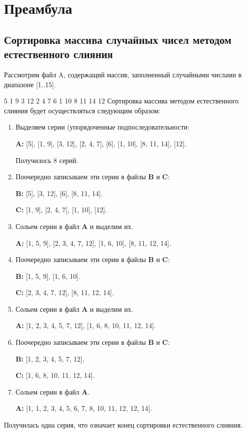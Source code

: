 \documentclass[a4paper, 14pt]{extarticle}
\begin{document}

\newpage
\tableofcontents
\newpage
\section{Преамбула}
\subsection{Сортировка массива случайных чисел методом естественного слияния}
Рассмотрим файл A, содержащий массив, заполненный случайными числами в диапазоне [1..15].

5 1 9 3 12 2 4 7 6 1 10 8 11 14 12
Сортировка массива методом естественного слияния будет осуществляться
следующим образом:
\begin{enumerate}
  \item Выделяем серии (упорядоченные подпоследовательности:

    \textbf{A:} [5], [1, 9], [3, 12], [2, 4, 7], [6], [1, 10], [8, 11, 14], [12].

    Получилось 8 серий.
  \item Поочередно записываем эти серии в файлы \textbf{B} и \textbf{C}:

    \textbf{B:} [5], [3, 12], [6], [8, 11, 14].

    \textbf{C:} [1, 9], [2, 4, 7], [1, 10], [12].

  \item Сольем серии в файл \textbf{A} и выделим их.

    \textbf{A:} [1, 5, 9], [2, 3, 4, 7, 12], [1, 6, 10], [8, 11, 12, 14].

  \item Поочередно записываем эти серии в файлы \textbf{B} и \textbf{C}:

    \textbf{B:} [1, 5, 9], [1, 6, 10].

    \textbf{C:} [2, 3, 4, 7, 12], [8, 11, 12, 14].

  \item Сольем серии в файл \textbf{A} и выделим их.

    \textbf{A:} [1, 2, 3, 4, 5, 7, 12], [1, 6, 8, 10, 11, 12, 14].

  \item Поочередно записываем эти серии в файлы \textbf{B} и \textbf{C}:

    \textbf{B:} [1, 2, 3, 4, 5, 7, 12].

    \textbf{C:} [1, 6, 8, 10, 11, 12, 14].

  \item Сольем серии в файл \textbf{A}.

    \textbf{A:} [1, 1, 2, 3, 4, 5, 6, 7, 8, 10, 11, 12, 12, 14].

\end{enumerate}
Получилась одна серия, что означает конец сортировки естественного слияния.
\end{document}
